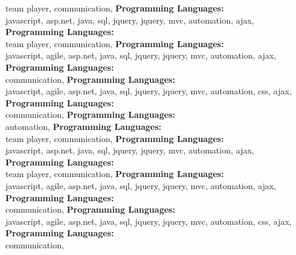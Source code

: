team player,  communication, \textbf{Programming Languages:} \\
javascript, asp.net, java, sql,  jquery, jquery, mvc, automation, ajax, \textbf{Programming Languages:} \\
team player,  communication, \textbf{Programming Languages:} \\
javascript, agile, asp.net, java, sql,  jquery, jquery, mvc, automation, ajax, \textbf{Programming Languages:} \\
 communication, \textbf{Programming Languages:} \\
javascript, agile, asp.net, java, sql,  jquery, jquery, mvc, automation, css, ajax, \textbf{Programming Languages:} \\
 communication, \textbf{Programming Languages:} \\
automation, \textbf{Programming Languages:} \\
team player,  communication, \textbf{Programming Languages:} \\
javascript, asp.net, java, sql,  jquery, jquery, mvc, automation, ajax, \textbf{Programming Languages:} \\
team player,  communication, \textbf{Programming Languages:} \\
javascript, agile, asp.net, java, sql,  jquery, jquery, mvc, automation, ajax, \textbf{Programming Languages:} \\
 communication, \textbf{Programming Languages:} \\
javascript, agile, asp.net, java, sql,  jquery, jquery, mvc, automation, css, ajax, \textbf{Programming Languages:} \\
 communication, 